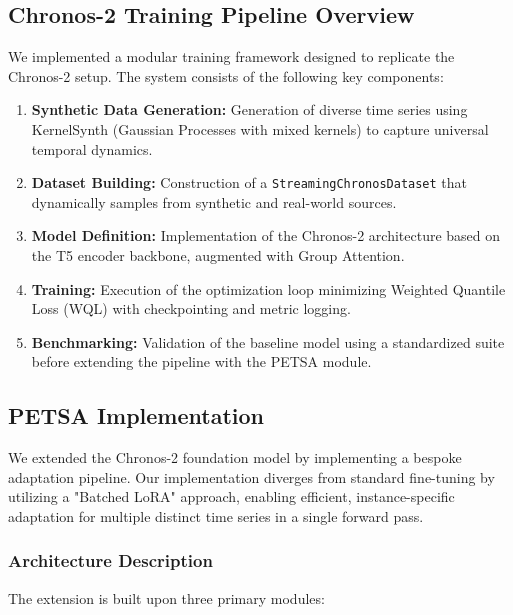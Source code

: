 \documentclass[conference]{IEEEtran}
\begin{document}
\subsection{Chronos-2 Training Pipeline Overview}
We implemented a modular training framework designed to replicate the Chronos-2 setup. The system consists of the following key components:

\begin{enumerate}
    \item \textbf{Synthetic Data Generation:} Generation of diverse time series using KernelSynth (Gaussian Processes with mixed kernels) to capture universal temporal dynamics.
    \item \textbf{Dataset Building:} Construction of a \texttt{StreamingChronosDataset} that dynamically samples from synthetic and real-world sources.
    \item \textbf{Model Definition:} Implementation of the Chronos-2 architecture based on the T5 encoder backbone, augmented with Group Attention.
    \item \textbf{Training:} Execution of the optimization loop minimizing Weighted Quantile Loss (WQL) with checkpointing and metric logging.
    \item \textbf{Benchmarking:} Validation of the baseline model using a standardized suite before extending the pipeline with the PETSA module.
\end{enumerate}

\subsection{PETSA Implementation}
We extended the Chronos-2 foundation model by implementing a bespoke adaptation pipeline. Our implementation diverges from standard fine-tuning by utilizing a "Batched LoRA" approach, enabling efficient, instance-specific adaptation for multiple distinct time series in a single forward pass.

\subsubsection{Architecture Description}
The extension is built upon three primary modules:
\end{document}
